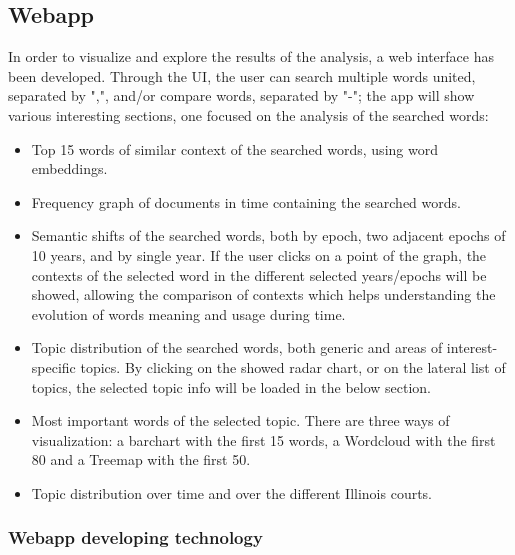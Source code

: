 \subsection{Webapp}
In order to visualize and explore the results of the analysis, a web interface has been developed. Through the UI, the
user can search multiple words united, separated by ",", and/or compare words, separated by "-"; the app will show
various interesting sections, one focused on the analysis of the searched words: 
\begin{itemize}
  \item Top 15 words of similar context of the searched words, using word embeddings.
  \item Frequency graph of documents in time containing the searched words.
  \item Semantic shifts of the searched words, both by epoch, two adjacent epochs of 10 years, and by single year.
    If the user clicks on a point of the graph, the contexts of the selected word in the different selected years/epochs
    will be showed, allowing the comparison of contexts which helps understanding the evolution of words meaning and usage
    during time.
  \item Topic distribution of the searched words, both generic and areas of interest-specific topics. By clicking on the
    showed radar chart, or on the lateral list of topics, the selected topic info will be loaded in the below section.
  \item Most important words of the selected topic. There are three ways of visualization: a barchart with the first 15
    words, a Wordcloud with the first 80 and a Treemap with the first 50.
  \item Topic distribution over time and over the different Illinois courts.
\end{itemize}

\subsubsection{Webapp developing technology}\hfill\\

